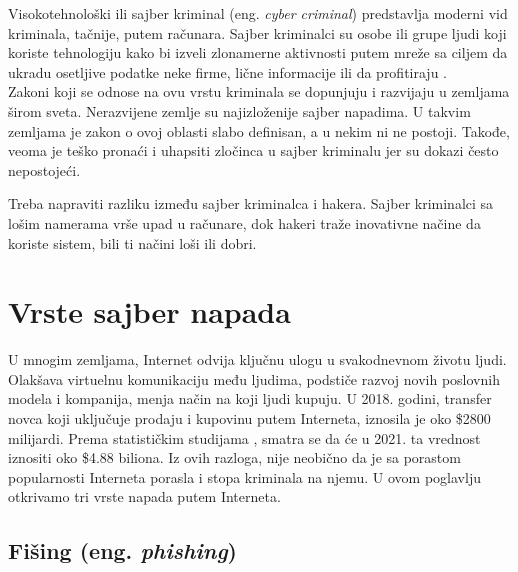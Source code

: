 \documentclass[a4paper]{article}
\theoremstyle{break}
\begin{document}
{Visokotehnološki ili sajber kriminal (eng. {\em cyber criminal}) predstavlja moderni vid kriminala, tačnije, putem računara. Sajber kriminalci su osobe ili grupe ljudi koji koriste tehnologiju kako bi izveli zlonamerne aktivnosti putem mreže sa ciljem da ukradu osetljive podatke neke firme, lične informacije ili da profitiraju \cite{sajber}.
\\Zakoni koji se odnose na ovu vrstu kriminala se dopunjuju i razvijaju u zemljama širom sveta. Nerazvijene zemlje su najizloženije sajber napadima. U takvim zemljama je zakon o ovoj oblasti slabo definisan, a u nekim ni ne postoji. Takođe, veoma je teško pronaći i uhapsiti zločinca u sajber kriminalu jer su dokazi često nepostojeći.

Treba napraviti razliku između sajber kriminalca i hakera. Sajber kriminalci sa lošim namerama vrše upad u računare, dok hakeri traže inovativne načine da koriste sistem, bili ti načini loši ili dobri.
\\

 

\section{Vrste sajber napada}

\label{sec:vrste_sajber_napada}

U mnogim zemljama, Internet odvija ključnu ulogu u svakodnevnom životu ljudi. Olakšava virtuelnu komunikaciju među ljudima, podstiče razvoj novih poslovnih modela i kompanija, menja način na koji ljudi kupuju. U 2018. godini, transfer novca koji uključuje prodaju i kupovinu putem Interneta, iznosila je oko \$2800 milijardi. Prema statističkim studijama \cite{statistika}, smatra se da će u 2021. ta vrednost iznositi oko \$4.88 biliona. Iz ovih razloga, nije neobično da je sa porastom popularnosti Interneta porasla i stopa kriminala na njemu. U ovom poglavlju otkrivamo tri vrste napada putem Interneta.

\subsection{Fišing (eng. {\em phishing})}
\label{subsec:phishing}

}
\end{document}
